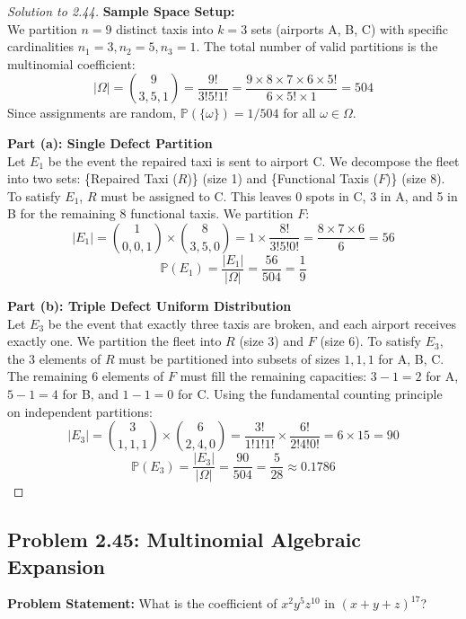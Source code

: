 \documentclass[11pt]{article}
\theoremstyle{definition}
\theoremstyle{plain}
\theoremstyle{remark}
\newcommand{\Prob}{\mathbb{P}}
\newcommand{\sample}{\Omega}
\begin{document}
\begin{proof}[Solution to 2.44]
\textbf{Sample Space Setup:} \\
We partition $n = 9$ distinct taxis into $k = 3$ sets (airports A, B, C) with specific cardinalities $n_1=3, n_2=5, n_3=1$. The total number of valid partitions is the multinomial coefficient:
\[
|\sample| = \binom{9}{3, 5, 1} = \frac{9!}{3! 5! 1!} = \frac{9 \times 8 \times 7 \times 6 \times 5!}{6 \times 5! \times 1} = 504
\]
Since assignments are random, $\Prob(\{\omega\}) = 1/504$ for all $\omega \in \sample$.

\textbf{Part (a): Single Defect Partition} \\
Let $E_1$ be the event the repaired taxi is sent to airport C. We decompose the fleet into two sets: \{Repaired Taxi ($R$)\} (size 1) and \{Functional Taxis ($F$)\} (size 8). 
To satisfy $E_1$, $R$ must be assigned to C. This leaves 0 spots in C, 3 in A, and 5 in B for the remaining 8 functional taxis. We partition $F$:
\[
|E_1| = \binom{1}{0,0,1} \times \binom{8}{3,5,0} = 1 \times \frac{8!}{3! 5! 0!} = \frac{8 \times 7 \times 6}{6} = 56
\]
\[
\Prob(E_1) = \frac{|E_1|}{|\sample|} = \frac{56}{504} = \frac{1}{9}
\]

\textbf{Part (b): Triple Defect Uniform Distribution} \\
Let $E_3$ be the event that exactly three taxis are broken, and each airport receives exactly one. We partition the fleet into $R$ (size 3) and $F$ (size 6). 
To satisfy $E_3$, the 3 elements of $R$ must be partitioned into subsets of sizes $1, 1, 1$ for A, B, C. The remaining 6 elements of $F$ must fill the remaining capacities: $3-1=2$ for A, $5-1=4$ for B, and $1-1=0$ for C. Using the fundamental counting principle on independent partitions:
\[
|E_3| = \binom{3}{1,1,1} \times \binom{6}{2,4,0} = \frac{3!}{1!1!1!} \times \frac{6!}{2!4!0!} = 6 \times 15 = 90
\]
\[
\Prob(E_3) = \frac{|E_3|}{|\sample|} = \frac{90}{504} = \frac{5}{28} \approx 0.1786
\]
\end{proof}

\subsection{Problem 2.45: Multinomial Algebraic Expansion}
\textbf{Problem Statement:} What is the coefficient of $x^2 y^5 z^{10}$ in $(x + y + z)^{17}$?
\end{document}
